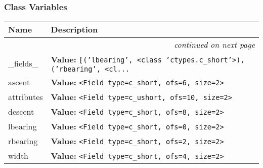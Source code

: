 
  \subsubsection{Class Variables}

    \vspace{-1cm}
\hspace{\varindent}\begin{longtable}{|p{\varnamewidth}|p{\vardescrwidth}|l}
\cline{1-2}
\cline{1-2} \centering \textbf{Name} & \centering \textbf{Description}& \\
\cline{1-2}
\endhead\cline{1-2}\multicolumn{3}{r}{\small\textit{continued on next page}}\\\endfoot\cline{1-2}
\endlastfoot\raggedright \_\-f\-i\-e\-l\-d\-s\-\_\- & \raggedright \textbf{Value:} 
{\tt \texttt{[}\texttt{(}\texttt{'}\texttt{lbearing}\texttt{'}\texttt{, }{\textless}class 'ctypes.c\_short'{\textgreater}\texttt{)}\texttt{, }\texttt{(}\texttt{'}\texttt{rbearing}\texttt{'}\texttt{, }{\textless}cl\texttt{...}}&\\
\cline{1-2}
\raggedright a\-s\-c\-e\-n\-t\- & \raggedright \textbf{Value:} 
{\tt {\textless}Field type=c\_short, ofs=6, size=2{\textgreater}}&\\
\cline{1-2}
\raggedright a\-t\-t\-r\-i\-b\-u\-t\-e\-s\- & \raggedright \textbf{Value:} 
{\tt {\textless}Field type=c\_ushort, ofs=10, size=2{\textgreater}}&\\
\cline{1-2}
\raggedright d\-e\-s\-c\-e\-n\-t\- & \raggedright \textbf{Value:} 
{\tt {\textless}Field type=c\_short, ofs=8, size=2{\textgreater}}&\\
\cline{1-2}
\raggedright l\-b\-e\-a\-r\-i\-n\-g\- & \raggedright \textbf{Value:} 
{\tt {\textless}Field type=c\_short, ofs=0, size=2{\textgreater}}&\\
\cline{1-2}
\raggedright r\-b\-e\-a\-r\-i\-n\-g\- & \raggedright \textbf{Value:} 
{\tt {\textless}Field type=c\_short, ofs=2, size=2{\textgreater}}&\\
\cline{1-2}
\raggedright w\-i\-d\-t\-h\- & \raggedright \textbf{Value:} 
{\tt {\textless}Field type=c\_short, ofs=4, size=2{\textgreater}}&\\
\cline{1-2}
\end{longtable}


